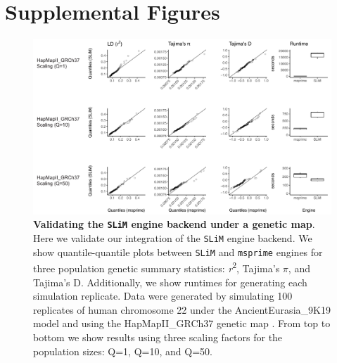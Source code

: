 \documentclass[12pt,halfline,a4paper]{ouparticle}
\newcommand{\beginsupplement}{%
        \setcounter{table}{0}
        \renewcommand{\thetable}{S\arabic{table}}%
        \renewcommand{\theHtable}{S\thetable}
        \setcounter{figure}{0}
        \renewcommand{\thefigure}{S\arabic{figure}}%
        \renewcommand{\theHfigure}{S\thefigure}
     }
\begin{document}



\pagebreak
\beginsupplement
\section*{Supplemental Figures}
\begin{figure}
\begin{center}
\includegraphics[width=0.8\linewidth]{display_items/HomSap_AE9K19_chr22_map_AI.pdf}
\caption{\textbf{Validating the \texttt{SLiM} engine backend under a genetic map}.
Here we validate our integration of the \texttt{SLiM} \citep{haller2019tree,haller2019slim} engine backend.
We show quantile-quantile plots between \texttt{SLiM} and \texttt{msprime} engines for three
population genetic summary statistics: \textit{r}\textsuperscript{2}, Tajima's $\pi$, and Tajima's D. Additionally, we
show runtimes for generating each simulation replicate. Data were generated by simulating 100 replicates
of human chromosome 22 under the AncientEurasia\_9K19 model \citep{kamm2019efficiently} and using the
HapMapII\_GRCh37 genetic map \citep{international2007second}. From top to bottom we show results
using three scaling factors for the population sizes: Q=1, Q=10, and Q=50.
}
\label{fig:slim_val_map}
\end{center}
\end{figure}
\end{document}
